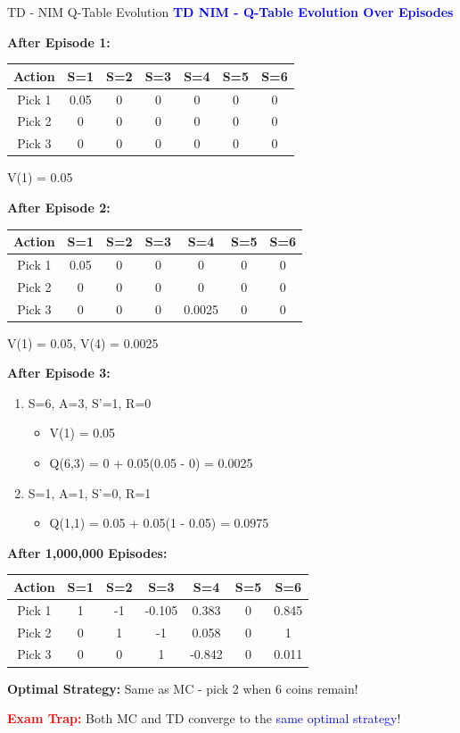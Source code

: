 \documentclass[8pt]{beamer}
\begin{document}
	\begin{frame}{TD - NIM Q-Table Evolution}
		\fontsize{6.5}{7.5}\selectfont
		\textcolor{blue}{\textbf{TD NIM - Q-Table Evolution Over Episodes}}
		
		\textbf{After Episode 1:}
		\begin{tabular}{|c|c|c|c|c|c|c|}
			\hline
			\textbf{Action} & \textbf{S=1} & \textbf{S=2} & \textbf{S=3} & \textbf{S=4} & \textbf{S=5} & \textbf{S=6} \\
			\hline
			Pick 1 & 0.05 & 0 & 0 & 0 & 0 & 0 \\
			\hline
			Pick 2 & 0 & 0 & 0 & 0 & 0 & 0 \\
			\hline
			Pick 3 & 0 & 0 & 0 & 0 & 0 & 0 \\
			\hline
		\end{tabular}
		V(1) = 0.05
		
		\textbf{After Episode 2:}
		\begin{tabular}{|c|c|c|c|c|c|c|}
			\hline
			\textbf{Action} & \textbf{S=1} & \textbf{S=2} & \textbf{S=3} & \textbf{S=4} & \textbf{S=5} & \textbf{S=6} \\
			\hline
			Pick 1 & 0.05 & 0 & 0 & 0 & 0 & 0 \\
			\hline
			Pick 2 & 0 & 0 & 0 & 0 & 0 & 0 \\
			\hline
			Pick 3 & 0 & 0 & 0 & 0.0025 & 0 & 0 \\
			\hline
		\end{tabular}
		V(1) = 0.05, V(4) = 0.0025
		
		\textbf{After Episode 3:}
		\begin{enumerate}
			\item S=6, A=3, S'=1, R=0
			\begin{itemize}
				\item V(1) = 0.05
				\item Q(6,3) = 0 + 0.05(0.05 - 0) = 0.0025
			\end{itemize}
			\item S=1, A=1, S'=0, R=1
			\begin{itemize}
				\item Q(1,1) = 0.05 + 0.05(1 - 0.05) = 0.0975
			\end{itemize}
		\end{enumerate}
		
		\textbf{After 1,000,000 Episodes:}
		\begin{tabular}{|c|c|c|c|c|c|c|}
			\hline
			\textbf{Action} & \textbf{S=1} & \textbf{S=2} & \textbf{S=3} & \textbf{S=4} & \textbf{S=5} & \textbf{S=6} \\
			\hline
			Pick 1 & 1 & -1 & -0.105 & 0.383 & 0 & 0.845 \\
			\hline
			Pick 2 & 0 & 1 & -1 & 0.058 & 0 & 1 \\
			\hline
			Pick 3 & 0 & 0 & 1 & -0.842 & 0 & 0.011 \\
			\hline
		\end{tabular}
		
		\textbf{Optimal Strategy:} Same as MC - pick 2 when 6 coins remain!
		
		\textcolor{red}{\textbf{Exam Trap:}} Both MC and TD converge to the \textcolor{blue}{same optimal strategy}!
	\end{frame}
	
\end{document}
